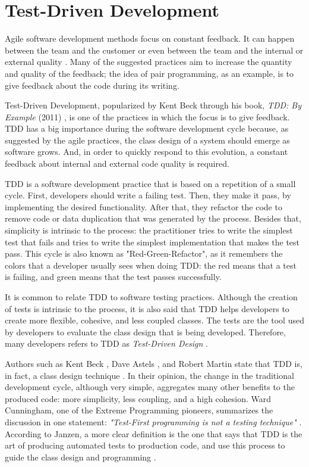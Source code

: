 \documentclass[conference]{IEEEtran}
\begin{document}
\section{Test-Driven Development}

Agile software development methods focus on constant feedback. It can happen
between the team and the customer or even between the team and the
internal or external quality \cite{AgileManifesto}. Many of the suggested practices
aim to increase the quantity and quality of the feedback; the idea of pair programming,
as an example, is to give feedback about the code during its writing.

Test-Driven Development, popularized by Kent Beck through his book, \textit{TDD: By Example} (2011)
\cite{TDDByExample}, is one of the practices in which the focus is to give feedback. TDD has
a big importance during the software development cycle because, as suggested by the agile
practices, the class design of a system should emerge as software grows. And, in order
to quickly respond to this evolution, a constant feedback about internal and external code
quality is required.

TDD is a software development practice that is based on a repetition of a small
cycle. First, developers should write a failing test. Then, they make it pass,
by implementing the desired functionality. After that, they refactor the code
to remove code or data duplication that was generated by the process. Besides that,
simplicity is intrinsic to the process: the practitioner tries to write the simplest
test that fails and tries to write the simplest implementation that makes the
test pass. This cycle is also known as "Red-Green-Refactor", as it remembers the
colors that a developer usually sees when doing TDD: the red means that a test
is failing, and green means that the test passes successfully.

It is common to relate TDD to software testing practices. Although the creation
of tests is intrinsic to the process, it is also said that TDD helps developers
to create more flexible, cohesive, and less coupled classes. The tests are the
tool used by developers to evaluate the class design that is being developed.
Therefore, many developers refers to TDD 
as \textit{Test-Driven Design} \cite{tdd-taxonomy}.

Authors such as Kent Beck \cite{aim-fire}, Dave Astels \cite{astels-tdd}, and
Robert Martin \cite{bob-martin} state that TDD is, in fact, a class design
technique \cite{tdd-taxonomy} \cite{aim-fire}.
In their opinion, the change in the traditional development cycle, although very simple,
aggregates many other benefits to the produced code: more simplicity, less coupling, and
a high cohesion. Ward Cunningham, one of the Extreme Programming pioneers, summarizes
the discussion in one statement: \textit{"Test-First programming is not a testing technique"} 
\cite{aim-fire}.
According to Janzen, a more clear definition is the one that says that TDD is the 
art of producing automated tests to production code, and use this process to guide
the class design and programming \cite{agilealliance-tdd} \cite{tdd-taxonomy}.
\end{document}

